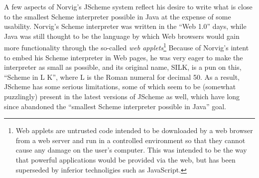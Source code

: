 A few aspects of Norvig's JScheme system reflect his desire to write
what is close to the smallest Scheme interpreter possible in Java at
the expense of some usability.  Norvig's Scheme interpreter was
written in the ``Web 1.0'' days, while Java was still thought to be
the language by which Web browsers would gain more functionality
through the so-called {\em web applets\/}\footnote{Web applets are
  untrusted code intended to be downloaded by a web browser from a web
  server and run in a controlled environment so that they cannot cause
  any damage on the user's computer.  This was intended to be the way
  that powerful applications would be provided via the web, but has
  been superseded by inferior technoligies such as JavaScript.}
Because of Norvig's intent to embed his Scheme interpreter in Web
pages, he was very eager to make the interpreter as small as possible,
and its original name, SILK, is a pun on this, ``Scheme in L K'',
where L is the Roman numeral for decimal 50.  As a result, JScheme has some
serious limitations, some of which seem to be (somewhat puzzlingly) present
in the latest versions of JScheme as well, which have long since abandoned
the ``smallest Scheme interpreter possible in Java'' goal.

